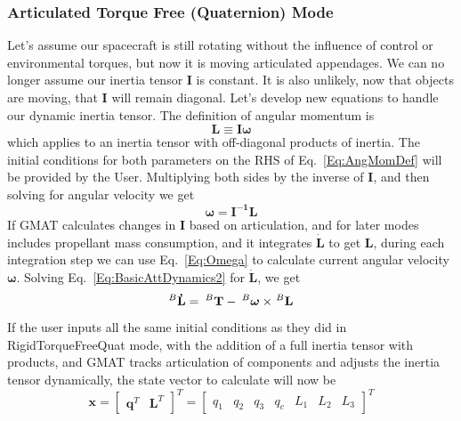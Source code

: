\subsubsection{Articulated Torque Free (Quaternion) Mode}
Let's assume our spacecraft is still rotating without the influence of control
or environmental torques, but now it is moving articulated appendages.  We can
no longer assume our inertia tensor $\mathbf{I}$ is constant.  It is also
unlikely, now that objects are moving, that $\mathbf{I}$ will remain diagonal.
Let's develop new equations to handle our dynamic inertia tensor.  The
definition of angular momentum is
%
\begin{equation}
    \mathbf{L} \equiv
        \mathbf{I} \boldsymbol{\omega}
        \label{Eq:AngMomDef}
\end{equation}
%
which applies to an inertia tensor with off-diagonal products of inertia.  The
initial conditions for both parameters on the RHS of Eq.~\ref{Eq:AngMomDef} will
be provided by the User.  Multiplying both sides by the inverse of $\mathbf{I}$,
and then solving for angular velocity we get
%
\begin{equation}
    \boldsymbol{\omega} =
        \mathbf{I^{-1}L}
    \label{Eq:Omega}
\end{equation}
%
If GMAT calculates changes in $\mathbf{I}$ based on articulation, and for later
modes includes propellant mass consumption, and it integrates $\mathbf{\dot{L}}$
to get $\mathbf{L}$, during each integration step we can use Eq.~\ref{Eq:Omega}
to calculate current angular velocity $\mathbf{\omega}$.  Solving
Eq.~\ref{Eq:BasicAttDynamics2} for $\mathbf{\dot{L}}$, we get
%
\begin{equation}
    ^{B}\mathbf{\dot{L}} = \hspace{0.082cm}
         ^{B}\mathbf{T}- \hspace{0.082cm} ^{B}\boldsymbol{\omega} \times \hspace{0.03cm} ^{B}\mathbf{L}
    \label{Eq:BasicAttDynamics4}
\end{equation}
%
If the user inputs all the same initial conditions as they did in
RigidTorqueFreeQuat mode, with the addition of a full inertia tensor with
products, and GMAT tracks articulation of components and adjusts the inertia
tensor dynamically, the state vector to calculate will now be
%
%
\begin{equation}
	\mathbf{x} =
        \begin{bmatrix}
            \boldsymbol{q}^T & \mathbf{L}^T
        \end{bmatrix}^T
        =
        \begin{bmatrix}
            q_1 & q_2 & q_3 & q_c & L_1 & L_2 & L_3
        \end{bmatrix}^T
    \label{Eq:QuatStateVec}
\end{equation}
